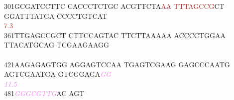 \documentclass[11pt,twoside,reqno,a4paper]{article}
\begin{document}
{301\hspace*{1\charwidth}GCGATCCTTC	CACCCTCTGC	ACGTTCTA\textcolor{brown}{A}\textcolor{brown}{A}	\textcolor{brown}{T}\textcolor{brown}{T}\textcolor{brown}{T}\textcolor{brown}{A}\textcolor{brown}{G}\textcolor{brown}{C}\textcolor{brown}{C}\textcolor{brown}{G}CT	GGATTTATGA	CCCCTGTCAT	\\
\hspace*{4\charwidth}\hspace*{1\charwidth}\hspace*{1\charwidth}\hspace*{28\charwidth}\textcolor{brown}{7.3}\hspace*{1\charwidth}\hspace*{1\charwidth}\hspace*{1\charwidth}\hspace*{1\charwidth}\\
361\hspace*{1\charwidth}TTGAGCCGCT	CTTCCAGTAC	TTCTTAAAAA	ACCCCTGGAA	TTACATGCAG	TCGAAGAAGG	\\
\hspace*{4\charwidth}\hspace*{1\charwidth}\hspace*{1\charwidth}\hspace*{1\charwidth}\hspace*{1\charwidth}\hspace*{1\charwidth}\hspace*{1\charwidth}\\
421\hspace*{1\charwidth}AAGAGAGTGG	AGGAGTCCAA	TGAGTCGAAG	GAGCCCAATG	AGTCGAATGA	GTCGGAGA\textit{\textcolor{violet}{G}}\textit{\textcolor{violet}{G}}	\\
\hspace*{4\charwidth}\hspace*{1\charwidth}\hspace*{1\charwidth}\hspace*{1\charwidth}\hspace*{1\charwidth}\hspace*{1\charwidth}\hspace*{58\charwidth}\textit{\textcolor{violet}{11.5}}\hspace*{1\charwidth}\\
481\hspace*{1\charwidth}\textit{\textcolor{violet}{G}}\textit{\textcolor{violet}{G}}\textit{\textcolor{violet}{G}}\textit{\textcolor{violet}{C}}\textit{\textcolor{violet}{G}}\textit{\textcolor{violet}{T}}\textit{\textcolor{violet}{T}}\textit{\textcolor{violet}{G}}AC	AGT\\
\hspace*{4\charwidth}\hspace*{1\charwidth}\\
}
\end{document}
